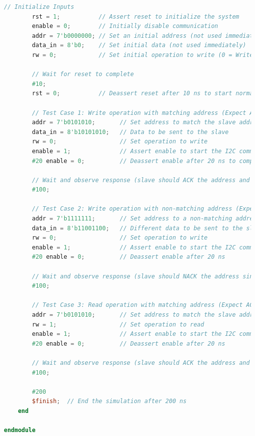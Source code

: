 \documentclass[a4paper,12pt]{report}
\begin{document}
\begin{lstlisting}[language=Verilog, caption={Testbench Module for Top Module}, label=lst:testbench_module]
        // Initialize Inputs
        rst = 1;           // Assert reset to initialize the system
        enable = 0;        // Initially disable communication
        addr = 7'b0000000; // Set an initial address (not used immediately)
        data_in = 8'b0;    // Set initial data (not used immediately)
        rw = 0;            // Set initial operation to write (0 = Write, 1 = Read)

        // Wait for reset to complete
        #10;
        rst = 0;           // Deassert reset after 10 ns to start normal operation

        // Test Case 1: Write operation with matching address (Expect ACK from slave)
        addr = 7'b0101010;       // Set address to match the slave address
        data_in = 8'b10101010;   // Data to be sent to the slave
        rw = 0;                  // Set operation to write
        enable = 1;              // Assert enable to start the I2C communication
        #20 enable = 0;          // Deassert enable after 20 ns to complete the command

        // Wait and observe response (slave should ACK the address and receive data)
        #100;

        // Test Case 2: Write operation with non-matching address (Expect NACK from slave)
        addr = 7'b1111111;       // Set address to a non-matching address for the slave
        data_in = 8'b11001100;   // Different data to be sent to the slave
        rw = 0;                  // Set operation to write
        enable = 1;              // Assert enable to start the I2C communication
        #20 enable = 0;          // Deassert enable after 20 ns

        // Wait and observe response (slave should NACK the address since it does not match)
        #100;

        // Test Case 3: Read operation with matching address (Expect ACK from slave and read data)
        addr = 7'b0101010;       // Set address to match the slave address
        rw = 1;                  // Set operation to read
        enable = 1;              // Assert enable to start the I2C communication
        #20 enable = 0;          // Deassert enable after 20 ns

        // Wait and observe response (slave should ACK the address and send data to master)
        #100;

        #200
        $finish;  // End the simulation after 200 ns
    end

endmodule
\end{lstlisting}
\newpage
\end{document}
